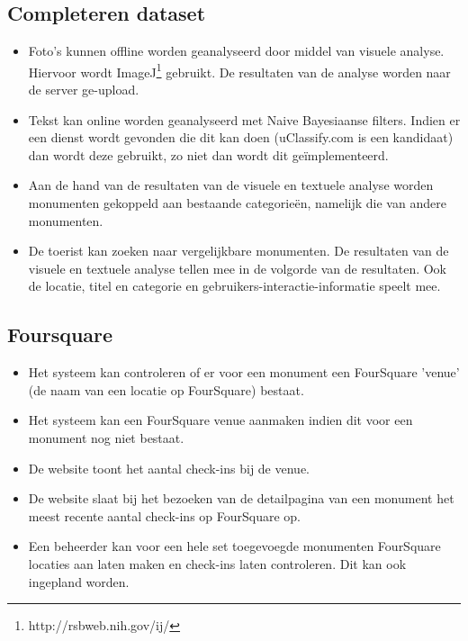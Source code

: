\documentclass[a4paper,10pt]{article}
\begin{document}
            \subsection{Completeren dataset}
            \begin{itemize}
                \item Foto's kunnen offline worden geanalyseerd door middel van visuele analyse. Hiervoor wordt ImageJ\footnote{http://rsbweb.nih.gov/ij/} gebruikt. De resultaten van de analyse worden naar de server ge-upload.
                \item Tekst kan online worden geanalyseerd met Naive Bayesiaanse filters. Indien er een dienst wordt gevonden die dit kan doen (uClassify.com is een kandidaat) dan wordt deze gebruikt, zo niet dan wordt dit ge\"implementeerd.
                \item Aan de hand van de resultaten van de visuele en textuele analyse worden monumenten gekoppeld aan bestaande categorie\"en, namelijk die van andere monumenten.
                \item De toerist kan zoeken naar vergelijkbare monumenten. De resultaten van de visuele en textuele analyse tellen mee in de volgorde van de resultaten. Ook de locatie, titel en categorie en gebruikers-interactie-informatie speelt mee.
            \end{itemize}
    
            \subsection{Foursquare}
            \begin{itemize}
                \item Het systeem kan controleren of er voor een monument een FourSquare 'venue' (de naam van een locatie op FourSquare) bestaat.
                \item Het systeem kan een FourSquare venue aanmaken indien dit voor een monument nog niet bestaat.
                \item De website toont het aantal check-ins bij de venue.
                \item De website slaat bij het bezoeken van de detailpagina van een monument het meest recente aantal check-ins op FourSquare op.
                \item Een beheerder kan voor een hele set toegevoegde monumenten FourSquare locaties aan laten maken en check-ins laten controleren. Dit kan ook ingepland worden.
            \end{itemize}
                
\end{document}
